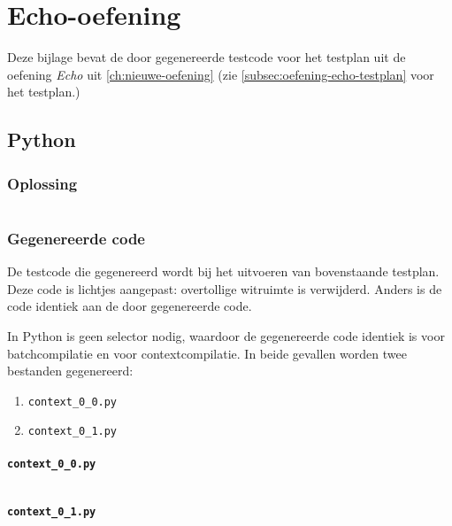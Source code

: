 \chapter{Echo-oefening}\label{ch:echo-oefening}

Deze bijlage bevat de door \tested{} gegenereerde testcode voor het testplan uit de oefening \emph{Echo} uit \cref{ch:nieuwe-oefening} (zie \cref{subsec:oefening-echo-testplan} voor het testplan.)

\section{Python}\label{sec:echo-python}

\subsection{Oplossing}\label{subsec:echo-python-oplossing}

\inputminted{python}{sources/echo/correct.py}

\subsection{Gegenereerde code}\label{subsec:echo-python-gegenereerde-code}

De testcode die gegenereerd wordt bij het uitvoeren van bovenstaande testplan.
Deze code is lichtjes aangepast: overtollige witruimte is verwijderd.
Anders is de code identiek aan de door \tested{} gegenereerde code.

In Python is geen selector nodig, waardoor de gegenereerde code identiek is voor batchcompilatie en voor contextcompilatie.
In beide gevallen worden twee bestanden gegenereerd:

\begin{enumerate}
    \item \texttt{context\_0\_0.py}
    \item \texttt{context\_0\_1.py}
\end{enumerate}

\subsubsection{\texttt{context\_0\_0.py}}

\inputminted{python}{sources/echo/context_0_0.py}

\subsubsection{\texttt{context\_0\_1.py}}

